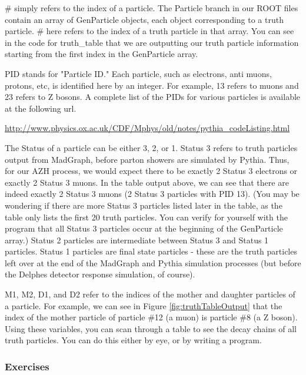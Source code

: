 \documentclass{article}
\begin{document}
\bigskip

\# simply refers to the index of a particle. The Particle branch in our ROOT files contain an array of GenParticle objects, each object corresponding to a truth particle. \# here refers to the index of a truth particle in that array. You can see in the code for truth\_table that we are outputting our truth particle information starting from the first index in the GenParticle array.

\bigskip

PID stands for "Particle ID." Each particle, such as electrons, anti muons, protons, etc, is identified here by an integer. For example, 13 refers to muons and 23 refers to Z bosons. A complete list of the PIDs for various particles is available at the following url.

\bigskip

\url{http://www.physics.ox.ac.uk/CDF/Mphys/old/notes/pythia_codeListing.html}

\bigskip

The Status of a particle can be either 3, 2, or 1. Status 3 refers to truth particles output from MadGraph, before parton showers are simulated by Pythia. Thus, for our AZH process, we would expect there to be exactly 2 Status 3 electrons or exactly 2 Status 3 muons. In the table output above, we can see that there are indeed exactly 2 Status 3 muons (2 Status 3 particles with PID 13). (You may be wondering if there are more Status 3 particles listed later in the table, as the table only lists the first 20 truth particles. You can verify for yourself with the program that all Status 3 particles occur at the beginning of the GenParticle array.) Status 2 particles are intermediate between Status 3 and Status 1 particles. Status 1 particles are final state particles - these are the truth particles left over at the end of the MadGraph and Pythia simulation processes (but before the Delphes detector response simulation, of course).

\bigskip

M1, M2, D1, and D2 refer to the indices of the mother and daughter particles of a particle. For example, we can see in Figure \ref{fig:truthTableOutput} that the index of the mother particle of particle \#12 (a muon) is particle \#8 (a Z boson). Using these variables, you can scan through a table to see the decay chains of all truth particles. You can do this either by eye, or by writing a program.

\subsubsection*{Exercises}
\end{document}
